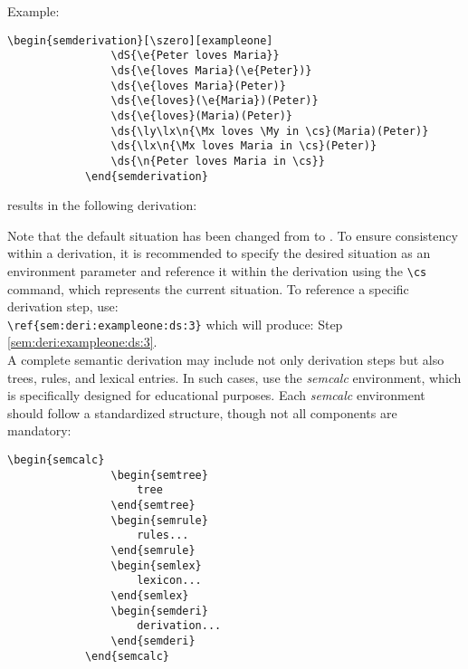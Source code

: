 \documentclass[10pt, a4paper]{article}
\begin{document}
	Example:
	\begin{lstlisting}[style=B]
			\begin{semderivation}[\szero][exampleone]
				\dS{\e{Peter loves Maria}}
				\ds{\e{loves Maria}(\e{Peter})}
				\ds{\e{loves Maria}(Peter)}
				\ds{\e{loves}(\e{Maria})(Peter)}
				\ds{\e{loves}(Maria)(Peter)}
				\ds{\ly\lx\n{\Mx loves \My in \cs}(Maria)(Peter)}
				\ds{\lx\n{\Mx loves Maria in \cs}(Peter)}
				\ds{\n{Peter loves Maria in \cs}}
			\end{semderivation}
	\end{lstlisting} 
	results in the following derivation: \begin{semderivation}[\szero][exampleone]
	\end{semderivation}
	Note that the default situation has been changed from \sstar to \szero. To ensure consistency within a derivation, it is recommended to specify the desired situation as an environment parameter and reference it within the derivation using the \verb=\cs= command, which represents the current situation. To reference a specific derivation step, use:
	\\\verb=\ref{sem:deri:exampleone:ds:3}=
	which will produce: Step \ref{sem:deri:exampleone:ds:3}.
	\\A complete semantic derivation may include not only derivation steps but also trees, rules, and lexical entries. In such cases, use the \textit{semcalc} environment, which is specifically designed for educational purposes. Each \textit{semcalc} environment should follow a standardized structure, though not all components are mandatory:
	\begin{lstlisting}[style=B]
			\begin{semcalc}
				\begin{semtree}
					tree
				\end{semtree}
				\begin{semrule}
					rules...
				\end{semrule}
				\begin{semlex}
					lexicon...
				\end{semlex}
				\begin{semderi}
					derivation...
				\end{semderi}
			\end{semcalc}
	\end{lstlisting}
\end{document}
